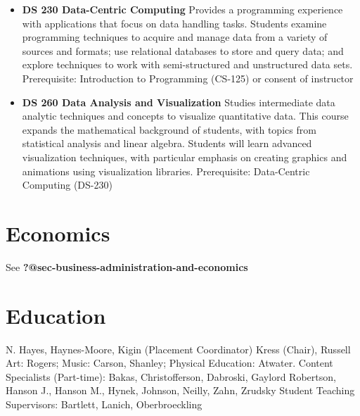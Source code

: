 \documentclass[
  letterpaper,
]{scrbook}
\providecommand{\tightlist}{%
  \setlength{\itemsep}{0pt}\setlength{\parskip}{0pt}}
\begin{document}
\begin{itemize}
\tightlist
\item
  \textbf{DS 230 Data-Centric Computing} Provides a programming
  experience with applications that focus on data handling tasks.
  Students examine programming techniques to acquire and manage data
  from a variety of sources and formats; use relational databases to
  store and query data; and explore techniques to work with
  semi-structured and unstructured data sets. Prerequisite: Introduction
  to Programming (CS-125) or consent of instructor\\
\item
  \textbf{DS 260 Data Analysis and Visualization} Studies intermediate
  data analytic techniques and concepts to visualize quantitative data.
  This course expands the mathematical background of students, with
  topics from statistical analysis and linear algebra. Students will
  learn advanced visualization techniques, with particular emphasis on
  creating graphics and animations using visualization libraries.
  Prerequisite: Data-Centric Computing (DS-230)
\end{itemize}

\hypertarget{sec-economics}{%
\section{Economics}\label{sec-economics}}

See \textbf{?@sec-business-administration-and-economics}

\hypertarget{sec-education}{%
\section{Education}\label{sec-education}}

N. Hayes, Haynes-Moore, Kigin (Placement Coordinator) Kress (Chair),
Russell Art: Rogers; Music: Carson, Shanley; Physical Education:
Atwater. Content Specialists (Part-time): Bakas, Christofferson,
Dabroski, Gaylord Robertson, Hanson J., Hanson M., Hynek, Johnson,
Neilly, Zahn, Zrudsky Student Teaching Supervisors: Bartlett, Lanich,
Oberbroeckling
\end{document}
